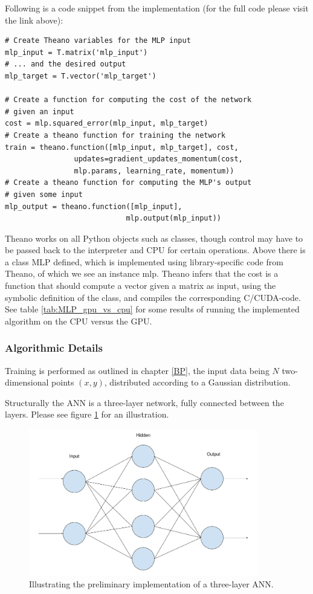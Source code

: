 Following is a code snippet from the implementation (for the full code please visit the link above):

\begin{verbatim}
# Create Theano variables for the MLP input
mlp_input = T.matrix('mlp_input')
# ... and the desired output
mlp_target = T.vector('mlp_target')

# Create a function for computing the cost of the network 
# given an input
cost = mlp.squared_error(mlp_input, mlp_target)
# Create a theano function for training the network
train = theano.function([mlp_input, mlp_target], cost,
                updates=gradient_updates_momentum(cost,
                mlp.params, learning_rate, momentum))
# Create a theano function for computing the MLP's output 
# given some input
mlp_output = theano.function([mlp_input], 
                            mlp.output(mlp_input))
\end{verbatim}

Theano works on all Python objects such as classes, though control may have to be passed back to the interpreter and CPU for certain operations. Above there is a class MLP defined, which is implemented using library-specific code from Theano, of which we see an instance mlp. Theano infers that the cost is a function that should compute a vector given a matrix as input, using the symbolic definition of the class, and compiles the corresponding C/CUDA-code. See table \ref{tab:MLP_gpu_vs_cpu} for some results of running the implemented algorithm on the CPU versus the GPU.


\subsubsection{Algorithmic Details}
Training is performed as outlined in chapter \ref{BP}, the input data being $N$ two-dimensional points $(x, y)$, distributed according to a Gaussian distribution.

Structurally the ANN is a three-layer network, fully connected between the layers. Please see figure \ref{fig:MLP_demo} for an illustration.

\begin{figure}
\centering
\includegraphics[width=10cm]{fig/MLP_demo}
\caption{Illustrating the preliminary implementation of a three-layer ANN.}
\label{fig:MLP_demo}
\end{figure}

